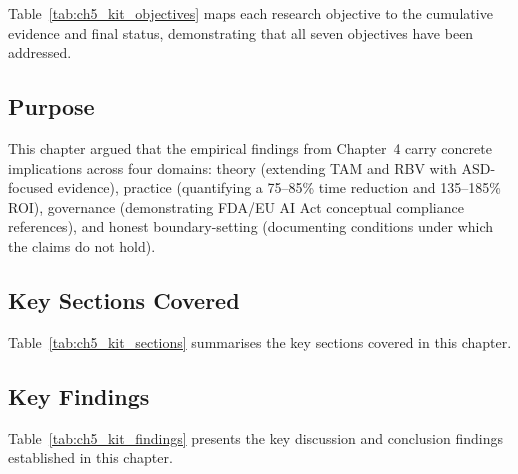 Table~\ref{tab:ch5_kit_objectives} maps each research objective to the cumulative evidence and final status, demonstrating that all seven objectives have been addressed.

\iffalse
\subsection{Purpose}

This chapter argued that the empirical findings from Chapter~4 carry concrete implications across four domains: theory (extending TAM and RBV with ASD-focused evidence), practice (quantifying a 75--85\% time reduction and 135--185\% ROI), governance (demonstrating FDA/EU AI Act conceptual compliance references), and honest boundary-setting (documenting conditions under which the claims do not hold).

\subsection{Key Sections Covered}

\noindent Table~\ref{tab:ch5_kit_sections} summarises the key sections covered in this chapter.

\subsection{Key Findings}

\noindent Table~\ref{tab:ch5_kit_findings} presents the key discussion and conclusion findings established in this chapter.


